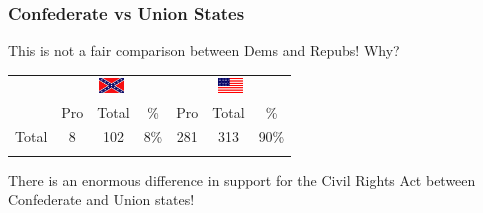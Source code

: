 \documentclass[slides]{beamer}\usepackage[]{graphicx}\usepackage[]{color}
\newcommand{\blue}[1]{\textcolor{blue2}{#1}}
\begin{document}
\begin{frame}
\frametitle{Confederate vs Union States}

This is not a fair comparison between Dems and Repubs!  Why?\pause

\vspace{0.25cm}

\begin{center}
	\begin{tabular}{c|ccc|ccc}
     & \multicolumn{3}{c|}{\includegraphics[height=0.4cm]{conf}}  & \multicolumn{3}{c}{\includegraphics[height=0.4cm]{union}} \\ 
     & Pro & Total & \% & Pro & Total & \% \\ 
    \hline
     Total & 8 & 102 & 8\% & 281 & 313 & \blue{90\%} \\ 
     \multicolumn{7}{c}{}
  \end{tabular}
\end{center}

\vspace{0.1cm}

There is an enormous difference in support for the Civil Rights Act between Confederate and Union states!

\end{frame}
\end{document}
